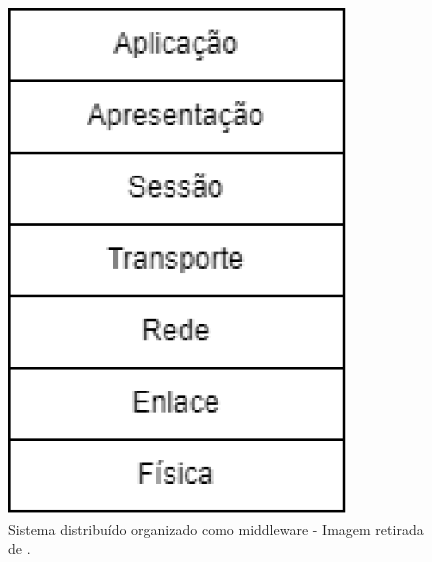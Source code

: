         \begin{figure}[h]
          \centering
          \includegraphics[width=0.8\textwidth]{figuras/modelo-osi.eps}
          \caption{Sistema distribuído organizado como middleware - Imagem retirada de \cite{}.}
          \label{fig:modelo-osi}
        \end{figure}
          

